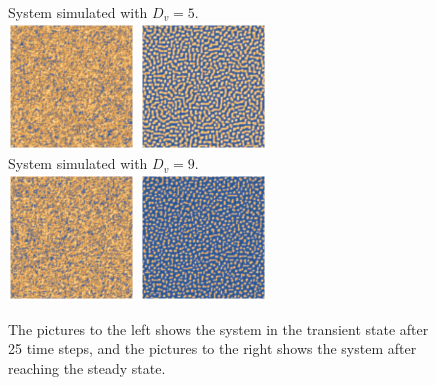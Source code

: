 \begin{figure}[h]
    System simulated with $D_v=5$.\\
    \includegraphics[width=0.3\textwidth]{img/2bd5transient.png}
    \includegraphics[width=0.3\textwidth]{img/2bd5.png}\\
    System simulated with $D_v=9$.\\
    \includegraphics[width=0.3\textwidth]{img/2bd9transient.png}
    \includegraphics[width=0.3\textwidth]{img/2bd9.png}
  \caption{The pictures to the left shows the system in the transient state after 25 time steps, and the pictures to the right shows the system after reaching the steady state.}
\end{figure}
